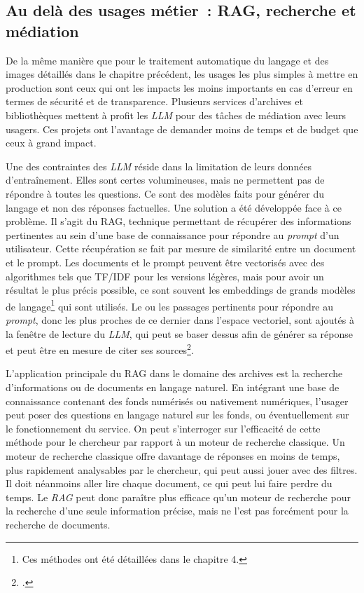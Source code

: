 	\subsection{Au delà des usages métier~: RAG, recherche et médiation}
	
	De la même manière que pour le traitement automatique du langage et des
	images détaillés dans le chapitre précédent, les usages les plus simples
	à mettre en production sont ceux qui ont les impacts les moins
	importants en cas d'erreur en termes de sécurité et de transparence.
	Plusieurs services d'archives et bibliothèques mettent à profit les \emph{LLM}
	pour des tâches de médiation avec leurs usagers. Ces projets ont
	l'avantage de demander moins de temps et de budget que ceux à
	grand impact.
	
	Une des contraintes des \emph{LLM} réside dans la limitation de leurs données
	d'entraînement. Elles sont certes volumineuses, mais ne
	permettent pas de répondre à toutes les questions. Ce sont des modèles
	faits pour générer du langage et non des réponses factuelles.
	 Une solution a été développée face à ce problème.
	Il s'agit du \gls{RAG}, technique permettant
	de récupérer des informations pertinentes au sein d'une base de connaissance pour répondre au \textit{\gls{prompt}} d'un
	utilisateur. Cette récupération se
	fait par mesure de similarité entre un document et le prompt. Les
	documents et le prompt peuvent être vectorisés avec des algorithmes tels
	que TF/IDF pour les versions légères, mais pour avoir un résultat le
	plus précis possible, ce sont souvent les \gls{embeddings} de grands modèles de
	langage\footnote{Ces méthodes ont été détaillées dans le chapitre 4.} qui
	sont utilisés. Le ou les passages pertinents pour
	répondre au \textit{prompt}, donc les plus proches de ce dernier dans l'espace
	vectoriel, sont ajoutés à la \gls{fenêtre} de lecture du \emph{LLM}, qui peut se
	baser dessus afin de générer sa réponse et peut être en mesure de citer
	ses sources\footcite{lewis_retrieval-augmented_2020}.
	
	L'application principale du \gls{RAG} dans le domaine des archives est la
	recherche d'informations ou de documents en langage naturel. En
	intégrant une base de connaissance contenant des fonds numérisés ou
	nativement numériques, l'usager peut poser des questions en langage
	naturel sur les fonds, ou éventuellement sur le fonctionnement du
	service. On peut s'interroger sur l'efficacité de cette méthode pour le
	chercheur par rapport à un moteur de recherche classique. Un moteur de
	recherche classique offre davantage de réponses en moins de temps, plus
	rapidement analysables par le chercheur, qui peut aussi jouer avec des
	filtres. Il doit néanmoins aller lire chaque document, ce qui peut lui
	faire perdre du temps. Le \emph{RAG} peut donc paraître plus efficace qu'un moteur de
	recherche pour la recherche d'une seule information précise, mais ne l'est pas
	forcément pour la recherche de documents.\newline
	
